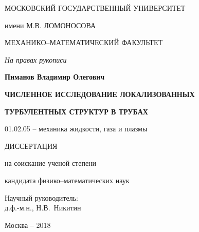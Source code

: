 \begin{titlepage}
\newpage
\pagestyle{plain} \thispagestyle{empty}

\centerline{МОСКОВСКИЙ ГОСУДАРСТВЕННЫЙ УНИВЕРСИТЕТ}
\centerline{имени М.В. ЛОМОНОСОВА}
\par
\centerline{МЕХАНИКО--МАТЕМАТИЧЕСКИЙ ФАКУЛЬТЕТ}
\par
\vspace*{1cm}
\begin{flushright}
{\it На правах рукописи}\\
\vspace*{1cm}


\end{flushright}
\par
\vspace*{1.5cm} \centerline{\bf Пиманов Владимир Олегович}
\vspace*{1cm} \centerline {\bf ЧИСЛЕННОЕ ИССЛЕДОВАНИЕ ЛОКАЛИЗОВАННЫХ}
 \centerline  {\bf ТУРБУЛЕНТНЫХ СТРУКТУР В ТРУБАХ}

\vspace*{1cm} \centerline{01.02.05 -- механика жидкости, газа и плазмы}

\vspace*{1cm} 
\centerline{ДИССЕРТАЦИЯ}
\centerline{на соискание ученой степени}
\centerline{кандидата физико--математических наук}

\vspace{30mm} \hfill\parbox[t]{80mm}{
Научный руководитель: \\
д.ф.-м.н., Н.В.~Никитин}

\par
\vspace*{4cm} \centerline{Москва -- 2018}

\end{titlepage}
